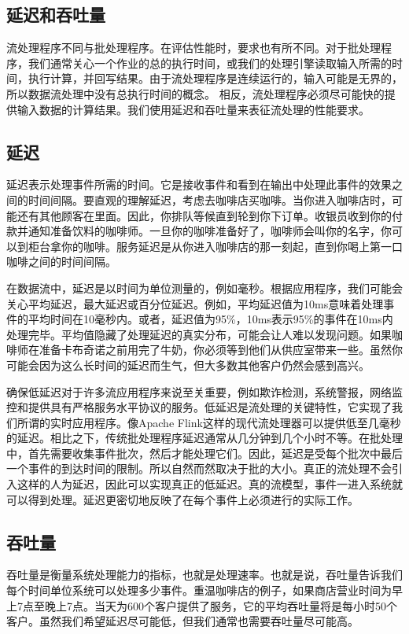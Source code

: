 \documentclass[cn,11pt,chinese]{elegantbook}
\begin{document}
\subsection{延迟和吞吐量}

流处理程序不同与批处理程序。在评估性能时，要求也有所不同。对于批处理程序，我们通常关心一个作业的总的执行时间，或我们的处理引擎读取输入所需的时间，执行计算，并回写结果。由于流处理程序是连续运行的，输入可能是无界的，所以数据流处理中没有总执行时间的概念。 相反，流处理程序必须尽可能快的提供输入数据的计算结果。我们使用延迟和吞吐量来表征流处理的性能要求。

\subsection{延迟}

延迟表示处理事件所需的时间。它是接收事件和看到在输出中处理此事件的效果之间的时间间隔。要直观的理解延迟，考虑去咖啡店买咖啡。当你进入咖啡店时，可能还有其他顾客在里面。因此，你排队等候直到轮到你下订单。收银员收到你的付款并通知准备饮料的咖啡师。一旦你的咖啡准备好了，咖啡师会叫你的名字，你可以到柜台拿你的咖啡。服务延迟是从你进入咖啡店的那一刻起，直到你喝上第一口咖啡之间的时间间隔。

在数据流中，延迟是以时间为单位测量的，例如毫秒。根据应用程序，我们可能会关心平均延迟，最大延迟或百分位延迟。例如，平均延迟值为10ms意味着处理事件的平均时间在10毫秒内。或者，延迟值为95\%，10ms表示95\%的事件在10ms内处理完毕。平均值隐藏了处理延迟的真实分布，可能会让人难以发现问题。如果咖啡师在准备卡布奇诺之前用完了牛奶，你必须等到他们从供应室带来一些。虽然你可能会因为这么长时间的延迟而生气，但大多数其他客户仍然会感到高兴。

确保低延迟对于许多流应用程序来说至关重要，例如欺诈检测，系统警报，网络监控和提供具有严格服务水平协议的服务。低延迟是流处理的关键特性，它实现了我们所谓的实时应用程序。像Apache Flink这样的现代流处理器可以提供低至几毫秒的延迟。相比之下，传统批处理程序延迟通常从几分钟到几个小时不等。在批处理中，首先需要收集事件批次，然后才能处理它们。因此，延迟是受每个批次中最后一个事件的到达时间的限制。所以自然而然取决于批的大小。真正的流处理不会引入这样的人为延迟，因此可以实现真正的低延迟。真的流模型，事件一进入系统就可以得到处理。延迟更密切地反映了在每个事件上必须进行的实际工作。

\subsection{吞吐量}

吞吐量是衡量系统处理能力的指标，也就是处理速率。也就是说，吞吐量告诉我们每个时间单位系统可以处理多少事件。重温咖啡店的例子，如果商店营业时间为早上7点至晚上7点。当天为600个客户提供了服务，它的平均吞吐量将是每小时50个客户。虽然我们希望延迟尽可能低，但我们通常也需要吞吐量尽可能高。
\end{document}
